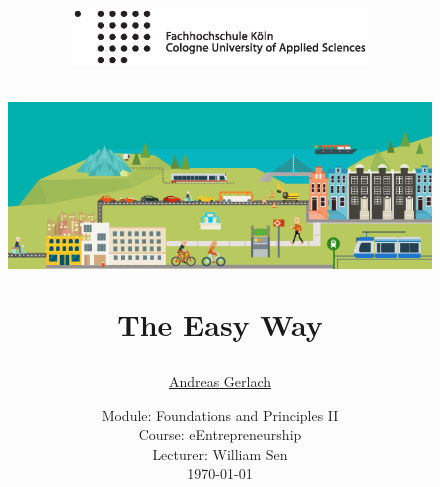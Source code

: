 \documentclass[a4paper]{article}
\begin{document}
	\title{
	\begin{figure}[!ht]
		\flushleft
			\includegraphics[width=0.7\textwidth]{logo.eps}
	\end{figure}
	\vspace{1cm}
	\begin{figure}[!ht]
	    \includegraphics[width=\textwidth]{Connected_commuters_SSpage.png}
	\end{figure}
	\vspace{1cm}
	\Huge The Easy Way \\
	}

	\vspace{1cm}


	\author{\Large \href{mailto:andreas.gerlach@smail.fh-koeln.de}{Andreas Gerlach}
	\vspace{1cm}}

	\date{
	\large Module: Foundations and Principles II \\ Course: eEntrepreneurship \\
	\vspace{0.8cm}
	\large Lecturer: William Sen \\
	\vspace{1cm}
	\today
	}

	\maketitle
	\setlength{\parindent}{0pt}

	\newpage
	\tableofcontents
	\newpage
	\listoffigures
	\vspace{2cm}
	\listoftables
	\newpage
\end{document}
